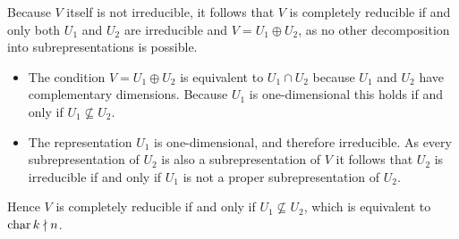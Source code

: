 \begin{example}
  Because $V$ itself is not irreducible, it follows that $V$ is completely reducible if and only both $U_1$ and $U_2$ are irreducible and $V = U_1 \oplus U_2$, as no other decomposition into subrepresentations is possible.
  \begin{itemize}
    \item
      The condition $V = U_1 \oplus U_2$ is equivalent to $U_1 \cap U_2$ because $U_1$ and $U_2$ have complementary dimensions.
      Because $U_1$ is one-dimensional this holds if and only if $U_1 \nsubseteq U_2$.
    \item
      The representation $U_1$ is one-dimensional, and therefore irreducible.
      As every subrepresentation of $U_2$ is also a subrepresentation of $V$ it follows that $U_2$ is irreducible if and only if $U_1$ is not a proper subrepresentation of $U_2$.
  \end{itemize}
  Hence $V$ is completely reducible if and only if $U_1 \nsubseteq U_2$, which is equivalent to $\operatorname{char} k \nmid n$.
\end{example}


